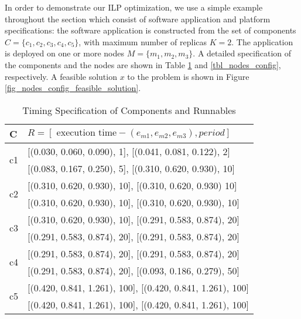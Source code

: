 In order to demonstrate our ILP optimization, we use a  simple example throughout the section which consist of software application and platform specifications: the software application is constructed from the set of components $C=\{c_1, c_2, c_3, c_4, c_5\}$, with maximum number of replicas $K=2$. The application is deployed on one or more nodes $M=\{m_1,m_2,m_3\}$. A detailed specification of the components and the nodes are shown in Table \ref{tbl_comps_config} and \ref{tbl_nodes_config}, respectively. A feasible solution $x$ to the problem is shown in Figure \ref{fig_nodes_config_feasible_solution}.
\begin{table}[h]
\centering
\begin{tabular}{@{}p{0.25cm}l@{}}
\toprule
C  & $R=[\text{ execution time}-(e_{m1}, e_{m2}, e_{m3}), period]$ \\ \midrule
\multirow{2}{4em}{c1} 
& [(0.030, 0.060, 0.090), 1], [(0.041, 0.081, 0.122), 2]\\[0.3em]
&[(0.083, 0.167, 0.250), 5], [(0.310, 0.620, 0.930), 10] \\[0.6em]
\multirow{2}{4em}{c2} 
& [(0.310, 0.620, 0.930), 10], [(0.310, 0.620, 0.930) 10]\\[0.3em]
&[(0.310, 0.620, 0.930), 10], [(0.310, 0.620, 0.930), 10]  \\[0.6em]
\multirow{2}{4em}{c3} 
& [(0.310, 0.620, 0.930), 10], [(0.291, 0.583, 0.874), 20]\\[0.3em]
& [(0.291, 0.583, 0.874), 20], [(0.291, 0.583, 0.874), 20]\\[0.6em]
\multirow{2}{4em}{c4} 
& [(0.291, 0.583, 0.874), 20], [(0.291, 0.583, 0.874), 20]\\[0.3em]
& [(0.291, 0.583, 0.874), 20], [(0.093, 0.186, 0.279), 50]\\[0.6em]
\multirow{2}{4em}{c5}  
& [(0.420, 0.841, 1.261), 100], [(0.420, 0.841, 1.261), 100]\\[0.3em]
& [(0.420, 0.841, 1.261), 100], [(0.420, 0.841, 1.261), 100]\\[0.3em]
\bottomrule
\end{tabular}
\caption{Timing Specification of Components and Runnables}
\label{tbl_comps_config}
\end{table}


